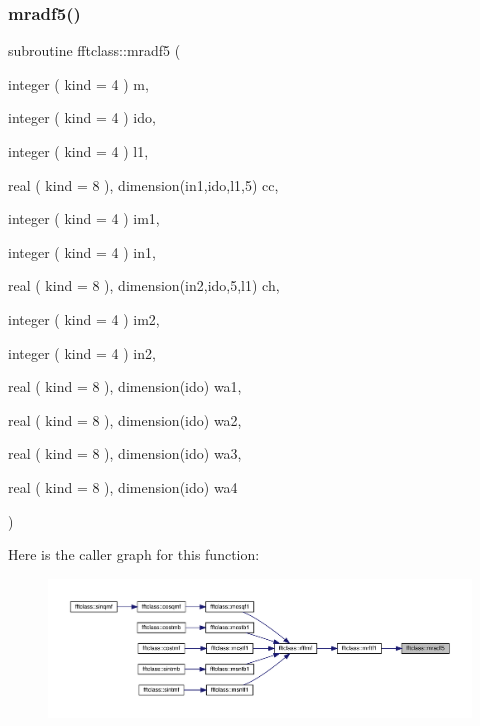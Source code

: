 \subsubsection{\texorpdfstring{mradf5()}{mradf5()}}
{\footnotesize\ttfamily subroutine fftclass\+::mradf5 (\begin{DoxyParamCaption}\item[{integer ( kind = 4 )}]{m,  }\item[{integer ( kind = 4 )}]{ido,  }\item[{integer ( kind = 4 )}]{l1,  }\item[{real ( kind = 8 ), dimension(in1,ido,l1,5)}]{cc,  }\item[{integer ( kind = 4 )}]{im1,  }\item[{integer ( kind = 4 )}]{in1,  }\item[{real ( kind = 8 ), dimension(in2,ido,5,l1)}]{ch,  }\item[{integer ( kind = 4 )}]{im2,  }\item[{integer ( kind = 4 )}]{in2,  }\item[{real ( kind = 8 ), dimension(ido)}]{wa1,  }\item[{real ( kind = 8 ), dimension(ido)}]{wa2,  }\item[{real ( kind = 8 ), dimension(ido)}]{wa3,  }\item[{real ( kind = 8 ), dimension(ido)}]{wa4 }\end{DoxyParamCaption})}

Here is the caller graph for this function\+:\nopagebreak
\begin{figure}[H]
\begin{center}
\leavevmode
\includegraphics[width=350pt]{namespacefftclass_ab6d74e30932fcf82744ac339de050933_icgraph}
\end{center}
\end{figure}
\mbox{\label{namespacefftclass_a5741ec7db9519828a0c46df4355b734d}} 
